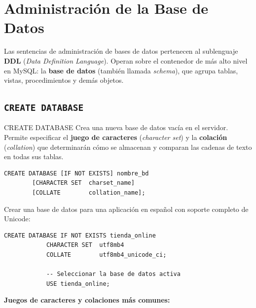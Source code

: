 \documentclass[12pt, a4paper]{article}
\begin{document}
	\newpage
	\section{Administración de la Base de Datos}
	
	Las sentencias de administración de bases de datos pertenecen al sublenguaje
	\textbf{DDL} (\textit{Data Definition Language}). Operan sobre el contenedor de más alto nivel en MySQL: la
	\textbf{base de datos} (también llamada \textit{schema}), que agrupa tablas,
	vistas, procedimientos y demás objetos.
	
	\subsection{\texttt{CREATE DATABASE}}
	
	\begin{definicion}{CREATE DATABASE}
		Crea una nueva base de datos vacía en el servidor. Permite especificar el
		\textbf{juego de caracteres} (\textit{character set}) y la
		\textbf{colación} (\textit{collation}) que determinarán cómo se almacenan
		y comparan las cadenas de texto en todas sus tablas.
	\end{definicion}
	
	\begin{lstlisting}[style=sql, caption={Sintaxis de CREATE DATABASE}]
		CREATE DATABASE [IF NOT EXISTS] nombre_bd
		[CHARACTER SET  charset_name]
		[COLLATE        collation_name];
	\end{lstlisting}
	
	\begin{ejemplo}
		Crear una base de datos para una aplicación en español con soporte
		completo de Unicode:
		
		\begin{lstlisting}[style=sql, caption={Base de datos con utf8mb4 y collation en español}]
			CREATE DATABASE IF NOT EXISTS tienda_online
			CHARACTER SET  utf8mb4
			COLLATE        utf8mb4_unicode_ci;
			
			-- Seleccionar la base de datos activa
			USE tienda_online;
		\end{lstlisting}
	\end{ejemplo}
	
	\textbf{Juegos de caracteres y colaciones más comunes:}
	
\end{document}
